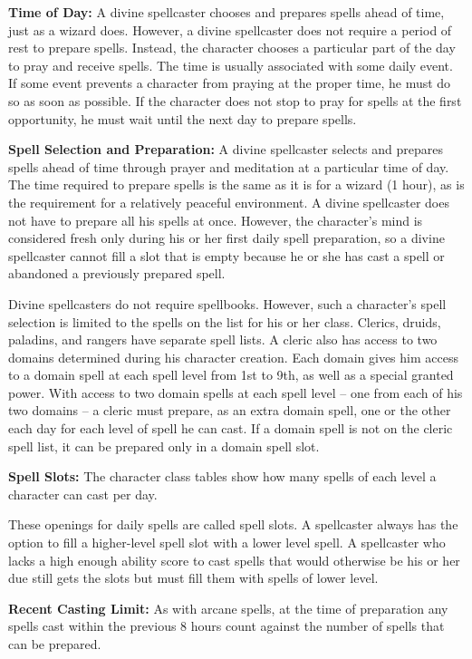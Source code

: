 \textbf{Time of Day:} A divine spellcaster chooses and prepares spells ahead of 
time, just as a wizard does. However, a divine spellcaster does not require a period 
of rest to prepare spells. Instead, the character chooses a particular part of 
the day to pray and receive spells. The time is usually associated with some daily 
event. If some event prevents a character from praying at the proper time, he must 
do so as soon as possible. If the character does not stop to pray for spells at 
the first opportunity, he must wait until the next day to prepare spells.

\textbf{Spell Selection and Preparation:} A divine spellcaster selects and prepares 
spells ahead of time through prayer and meditation at a particular time of day. 
The time required to prepare spells is the same as it is for a wizard (1 hour), 
as is the requirement for a relatively peaceful environment. A divine spellcaster 
does not have to prepare all his spells at once. However, the character's mind 
is considered fresh only during his or her first daily spell preparation, so a 
divine spellcaster cannot fill a slot that is empty because he or she has cast 
a spell or abandoned a previously prepared spell.

Divine spellcasters do not require spellbooks. However, such a character's spell 
selection is limited to the spells on the list for his or her class. Clerics, druids, 
paladins, and rangers have separate spell lists. A cleric also has access to two 
domains determined during his character creation. Each domain gives him access 
to a domain spell at each spell level from 1st to 9th, as well as a special granted 
power. With access to two domain spells at each spell level -- one from each of 
his two domains -- a cleric must prepare, as an extra domain spell, one or the other 
each day for each level of spell he can cast. If a domain spell is not on the cleric 
spell list, it can be prepared only in a domain spell slot.

\textbf{Spell Slots:} The character class tables show how many spells of each level 
a character can cast per day.

These openings for daily spells are called spell slots. A spellcaster always has 
the option to fill a higher-level spell slot with a lower level spell. A spellcaster 
who lacks a high enough ability score to cast spells that would otherwise be his 
or her due still gets the slots but must fill them with spells of lower level. 

\textbf{Recent Casting Limit:} As with arcane spells, at the time of preparation 
any spells cast within the previous 8 hours count against the number of spells 
that can be prepared.

